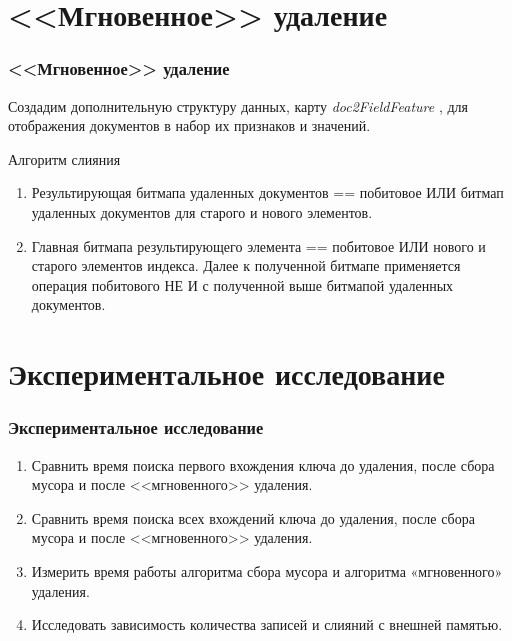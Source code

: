 \documentclass[aspectratio=169, pdf, 8pt, unicode]{beamer}
\begin{document}
\section{<<Мгновенное>> удаление}

\begin{frame}[fragile]
\frametitle{<<Мгновенное>> удаление}

Создадим дополнительную структуру данных, карту \textit{doc2FieldFeature} , для отображения документов в набор их признаков и значений.

\begin{block}{Алгоритм слияния}
    \begin{enumerate}
        \item Результирующая битмапа удаленных документов == побитовое ИЛИ битмап удаленных документов для старого и нового элементов.
        \item Главная битмапа результирующего элемента == побитовое ИЛИ нового и старого элементов индекса. Далее к полученной битмапе
        применяется операция побитового НЕ И с полученной выше битмапой удаленных документов.
    \end{enumerate}
\end{block}
\end{frame}

\section{Экспериментальное исследование}

\begin{frame}[fragile]
\frametitle{Экспериментальное исследование}

\begin{enumerate}
    \item Сравнить время поиска первого вхождения ключа до удаления,
    после сбора мусора и после <<мгновенного>> удаления.
    \vspace{4mm}
    \item Сравнить время поиска всех вхождений ключа до удаления,
    после сбора мусора и после <<мгновенного>> удаления.
    \vspace{4mm}
    \item Измерить время работы алгоритма сбора мусора и алгоритма
    «мгновенного» удаления.
    \vspace{4mm}
    \item Исследовать зависимость количества записей и слияний с внешней памятью.
\end{enumerate}
\end{frame}
\end{document}
